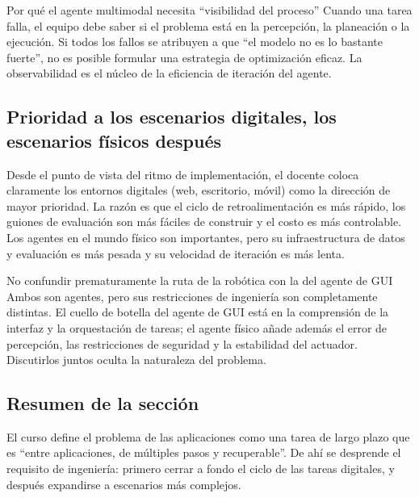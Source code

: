 \begin{knowledgebox}{Por qué el agente multimodal necesita ``visibilidad del proceso''}
Cuando una tarea falla, el equipo debe saber si el problema está en la percepción, la planeación o la ejecución. Si todos los fallos se atribuyen a que ``el modelo no es lo bastante fuerte'', no es posible formular una estrategia de optimización eficaz. La observabilidad es el núcleo de la eficiencia de iteración del agente.
\end{knowledgebox}

\subsection{Prioridad a los escenarios digitales, los escenarios físicos después}
Desde el punto de vista del ritmo de implementación, el docente coloca claramente los entornos digitales (web, escritorio, móvil) como la dirección de mayor prioridad. La razón es que el ciclo de retroalimentación es más rápido, los guiones de evaluación son más fáciles de construir y el costo es más controlable. Los agentes en el mundo físico son importantes, pero su infraestructura de datos y evaluación es más pesada y su velocidad de iteración es más lenta.

\begin{warningbox}{No confundir prematuramente la ruta de la robótica con la del agente de GUI}
Ambos son agentes, pero sus restricciones de ingeniería son completamente distintas. El cuello de botella del agente de GUI está en la comprensión de la interfaz y la orquestación de tareas; el agente físico añade además el error de percepción, las restricciones de seguridad y la estabilidad del actuador. Discutirlos juntos oculta la naturaleza del problema.
\end{warningbox}

\subsection{Resumen de la sección}
El curso define el problema de las aplicaciones como una tarea de largo plazo que es ``entre aplicaciones, de múltiples pasos y recuperable''. De ahí se desprende el requisito de ingeniería: primero cerrar a fondo el ciclo de las tareas digitales, y después expandirse a escenarios más complejos.

